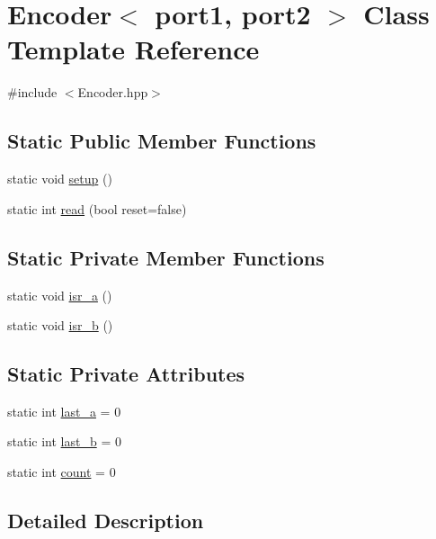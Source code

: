 \hypertarget{classEncoder}{\section{Encoder$<$ port1, port2 $>$ Class Template Reference}
\label{classEncoder}
}


{\ttfamily \#include $<$Encoder.\-hpp$>$}

\subsection*{Static Public Member Functions}
\begin{DoxyCompactItemize}
\item 
static void \hyperlink{classEncoder_a7945aef1fa1eef9c69eae3059c7383f5}{setup} ()
\item 
static int \hyperlink{classEncoder_ad4a82c2cb43afce3149e206e42796173}{read} (bool reset=false)
\end{DoxyCompactItemize}
\subsection*{Static Private Member Functions}
\begin{DoxyCompactItemize}
\item 
static void \hyperlink{classEncoder_ac4291694602efae2fd808c622aa08466}{isr\-\_\-a} ()
\item 
static void \hyperlink{classEncoder_a13da10ca35269f3e369c637e3fe492e9}{isr\-\_\-b} ()
\end{DoxyCompactItemize}
\subsection*{Static Private Attributes}
\begin{DoxyCompactItemize}
\item 
static int \hyperlink{classEncoder_af68226c82a0ec90d00cc40d733ca9eab}{last\-\_\-a} = 0
\item 
static int \hyperlink{classEncoder_a5a4bc2fcd23a97e69a47ecf3cd6e0914}{last\-\_\-b} = 0
\item 
static int \hyperlink{classEncoder_a7f71986ee5780e0fe3a91c93b7116c38}{count} = 0
\end{DoxyCompactItemize}


\subsection{Detailed Description}
